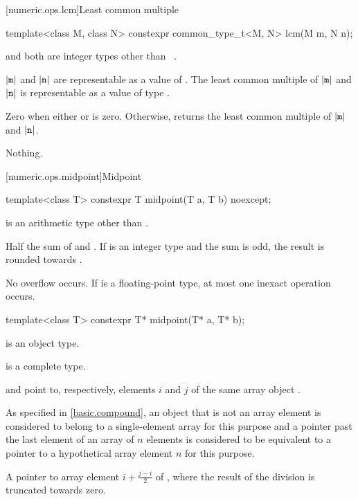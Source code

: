 [numeric.ops.lcm]{Least common multiple}

%
\begin{itemdecl}
template<class M, class N>
  constexpr common_type_t<M, N> lcm(M m, N n);
\end{itemdecl}

\begin{itemdescr}
\pnum
\mandates
{} and  both are integer types other than
\cv{}~.

\pnum
\expects
$|\tcode{m}|$ and $|\tcode{n}|$
are representable as a value of .
The least common multiple of $|\tcode{m}|$ and $|\tcode{n}|$
is representable as a value of type .

\pnum
\returns
Zero when either  or  is zero.
Otherwise, returns the least common multiple of $|\tcode{m}|$ and $|\tcode{n}|$.

\pnum
\throws
Nothing.
\end{itemdescr}

[numeric.ops.midpoint]{Midpoint}

%
\begin{itemdecl}
template<class T>
  constexpr T midpoint(T a, T b) noexcept;
\end{itemdecl}
\begin{itemdescr}
\pnum
\constraints
{} is an arithmetic type other than .

\pnum
\returns
Half the sum of  and .
If  is an integer type and the sum is odd,
the result is rounded towards .

\pnum
\remarks
No overflow occurs.
If  is a floating-point type, at most one inexact operation occurs.
\end{itemdescr}

%
\begin{itemdecl}
template<class T>
  constexpr T* midpoint(T* a, T* b);
\end{itemdecl}
\begin{itemdescr}
\pnum
\constraints
{} is an object type.

\pnum
\mandates
{} is a complete type.

\pnum
\expects
{} and  point to, respectively,
elements $i$ and $j$ of the same array object .
\begin{note}
As specified in \ref{basic.compound},
an object that is not an array element
is considered to belong to a single-element array for this purpose and
a pointer past the last element of an array of $n$ elements
is considered to be equivalent to a pointer
to a hypothetical array element $n$ for this purpose.
\end{note}

\pnum
\returns
A pointer to array element $i+\frac{j-i}{2}$ of ,
where the result of the division is truncated towards zero.
\end{itemdescr}

